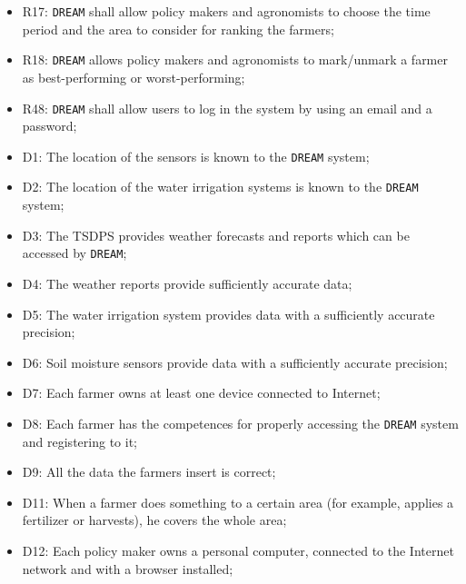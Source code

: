\documentclass{article}
\begin{document}
\begin{itemize}
    \item R17: \verb|DREAM| shall allow policy makers and agronomists to choose the time period and the area to consider for ranking the farmers;
    
    \item R18: \verb|DREAM| allows policy makers and agronomists to mark/unmark a farmer as best-performing or worst-performing;
    
    \item R48: \verb|DREAM| shall allow users to log in the system by using an email and a password;
    
    \item D1: The location of the sensors is known to the \verb|DREAM| system;
    
    \item D2: The location of the water irrigation systems is known to the \verb|DREAM| system;
    
    \item D3: The TSDPS provides weather forecasts and reports which can be accessed by \verb|DREAM|;
    
    \item D4: The weather reports provide sufficiently accurate data;
    
    \item D5: The water irrigation system provides data with a sufficiently accurate precision;
    
    \item D6: Soil moisture sensors provide data with a sufficiently accurate precision;
    
    \item D7: Each farmer owns at least one device connected to Internet;
    
    \item D8: Each farmer has the competences for properly accessing the \verb|DREAM| system and registering to it;
    
    \item D9: All the data the farmers insert is correct;
    
    \item D11: When a farmer does something to a certain area (for example, applies a fertilizer or harvests), he covers the whole area;
    
    \item D12: Each policy maker owns a personal computer, connected to the Internet network and with a browser installed;
    

\end{itemize}
\end{document}
